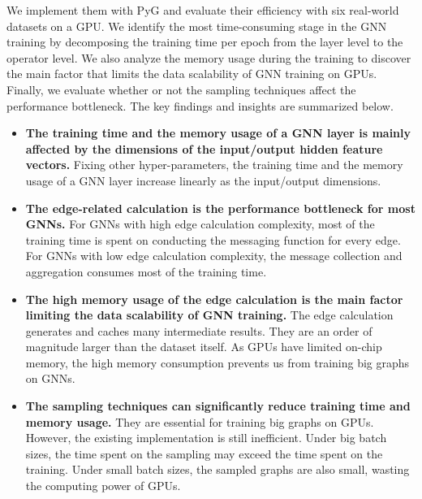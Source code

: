 We implement them with PyG and evaluate their efficiency with six real-world datasets on a GPU.
We identify the most time-consuming stage in the GNN training by decomposing the training time per epoch from the layer level to the operator level.
We also analyze the memory usage during the training to discover the main factor that limits the data scalability of GNN training on GPUs. 
Finally, we evaluate whether or not the sampling techniques affect the performance bottleneck. 
The key findings and insights are summarized below.

\begin{itemize}
    \item \textbf{The training time and the memory usage of a GNN layer is mainly affected by the dimensions of the input/output hidden feature vectors.}
    Fixing other hyper-parameters, the training time and the memory usage of a GNN layer increase linearly as the input/output dimensions.
    \item \textbf{The edge-related calculation is the performance bottleneck for most GNNs.}
    For GNNs with high edge calculation complexity, most of the training time is spent on conducting the messaging function for every edge. 
    For GNNs with low edge calculation complexity, the message collection and aggregation consumes most of the training time.
    \item \textbf{The high memory usage of the edge calculation is the main factor limiting the data scalability of GNN training.}
    The edge calculation generates and caches many intermediate results. 
    They are an order of magnitude larger than the dataset itself. 
    As GPUs have limited on-chip memory, the high memory consumption prevents us from training big graphs on GNNs.
    \item \textbf{The sampling techniques can significantly reduce training time and memory usage.}
    They are essential for training big graphs on GPUs. 
    However, the existing implementation is still inefficient. 
    Under big batch sizes, the time spent on the sampling may exceed the time spent on the training. 
    Under small batch sizes, the sampled graphs are also small, wasting the computing power of GPUs.
\end{itemize}

